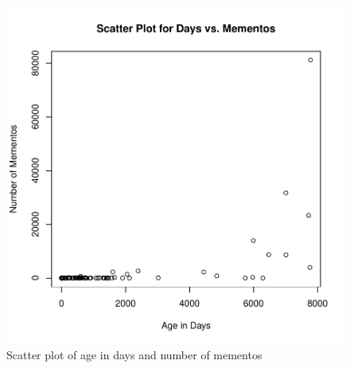 \documentclass[letterpaper,11pt]{article}
\begin{document}

\begin{figure}[h]
\centering
\includegraphics[scale=1.0]{ageuri.pdf}
\caption{Scatter plot of age in days and number of mementos}
\label{fig:scatterplot}
\end{figure}
\clearpage
\end{document}
